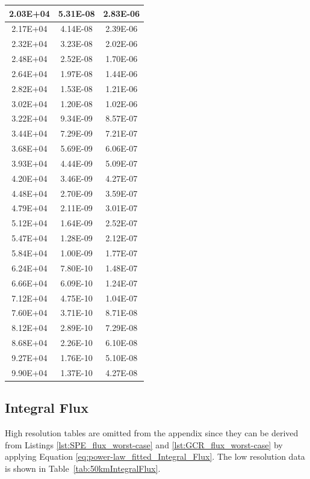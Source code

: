 \documentclass{hitec}
\begin{document}
\begin{table}[h]
{\begin{tabular}{|c|c|c|}
			2.03E+04&	5.31E-08&	2.83E-06\\ \hline
			2.17E+04&	4.14E-08&	2.39E-06\\ \hline
			2.32E+04&	3.23E-08&	2.02E-06\\ \hline
			2.48E+04&	2.52E-08&	1.70E-06\\ \hline
			2.64E+04&	1.97E-08&	1.44E-06\\ \hline
			2.82E+04&	1.53E-08&	1.21E-06\\ \hline
			3.02E+04&	1.20E-08&	1.02E-06\\ \hline
			3.22E+04&	9.34E-09&	8.57E-07\\ \hline
			3.44E+04&	7.29E-09&	7.21E-07\\ \hline
			3.68E+04&	5.69E-09&	6.06E-07\\ \hline
			3.93E+04&	4.44E-09&	5.09E-07\\ \hline
			4.20E+04&	3.46E-09&	4.27E-07\\ \hline
			4.48E+04&	2.70E-09&	3.59E-07\\ \hline
			4.79E+04&	2.11E-09&	3.01E-07\\ \hline
			5.12E+04&	1.64E-09&	2.52E-07\\ \hline
			5.47E+04&	1.28E-09&	2.12E-07\\ \hline
			5.84E+04&	1.00E-09&	1.77E-07\\ \hline
			6.24E+04&	7.80E-10&	1.48E-07\\ \hline
			6.66E+04&	6.09E-10&	1.24E-07\\ \hline
			7.12E+04&	4.75E-10&	1.04E-07\\ \hline
			7.60E+04&	3.71E-10&	8.71E-08\\ \hline
			8.12E+04&	2.89E-10&	7.29E-08\\ \hline
			8.68E+04&	2.26E-10&	6.10E-08\\ \hline
			9.27E+04&	1.76E-10&	5.10E-08\\ \hline
			9.90E+04&	1.37E-10&	4.27E-08\\ \hline
		\end{tabular}%
	}
\end{table}


\clearpage %

\subsection{Integral Flux}

High resolution tables are omitted from the appendix since they can be derived from Listings \ref{lst:SPE_flux_worst-case} and \ref{lst:GCR_flux_worst-case} by applying Equation \eqref{eq:power-law_fitted_Integral_Flux}. The low resolution data is shown in Table~\ref{tab:50kmIntegralFlux}.
\end{document}
